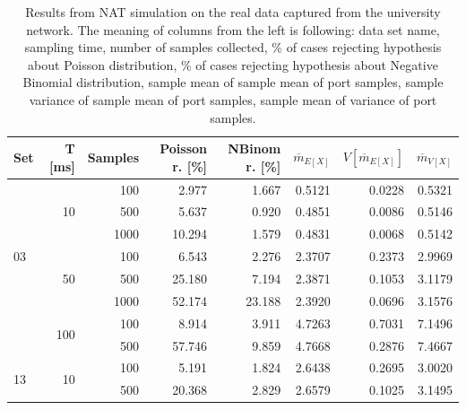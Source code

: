 \documentclass{llncs}
\begin{document}
\begin{table}[t]
  \centering
  \begin{tabular}{| l | r | r | r | r | r | r | r |} %
    \hline
    Set & T [ms] & Samples & Poisson r. [\%] & NBinom r. [\%] & $\overline{m}_{E[X]}$ &  $V[\overline{m}_{E[X]}]$  & $\overline{m}_{V[X]}$ \\ \hline \hline 
    \multirow{7}{*}{03} & \multirow{3}{*}{10}   & 100		& 2.977		& 1.667		& 0.5121        & 0.0228                    & 0.5321 \\ \cline{3-8}
      &      & 500      	& 5.637		& 0.920		& 0.4851        & 0.0086        & 0.5146 \\  \cline{3-8}
      &      & 1000     	& 10.294	& 1.579		& 0.4831        & 0.0068        & 0.5142 \\  \cline{2-8}
      & \multirow{3}{*}{50}     & 100     	& 6.543		& 2.276 	& 2.3707	& 0.2373 & 2.9969 \\ \cline{3-8}
      &      & 500     		& 25.180	& 7.194		& 2.3871        & 0.1053        & 3.1179 \\ \cline{3-8}
      &      & 1000    		& 52.174	& 23.188	& 2.3920        & 0.0696        & 3.1576 \\ \cline{2-8}
      & \multirow{2}{*}{100}  	& 100		& 8.914		& 3.911		& 4.7263        & 0.7031                    & 7.1496 \\ \cline{3-8}
      &      & 500     		& 57.746	& 9.859		& 4.7668	& 0.2876 	& 7.4667 					\\ \hline

    \multirow{2}{*}{13}  & \multirow{2}{*}{10}     & 100     & 5.191      & 1.824     & 2.6438       &  0.2695    & 3.0020 \\ \cline{3-8}
      &      & 500     & 20.368     & 2.829     & 2.6579       &  0.1025                    & 3.1495 \\ \hline
  \end{tabular}
  \caption{Results from NAT simulation on the real data captured from the university network. 
    The meaning of columns from the left is following: data set name, sampling time, number of samples collected,
    \% of cases rejecting hypothesis about Poisson distribution,  
    \% of cases rejecting hypothesis about Negative Binomial distribution,
    sample mean of sample mean of port samples,
    sample variance of sample mean of port samples,
    sample mean of variance of port samples.}
  \label{tab:1}
\end{table}
\end{document}
